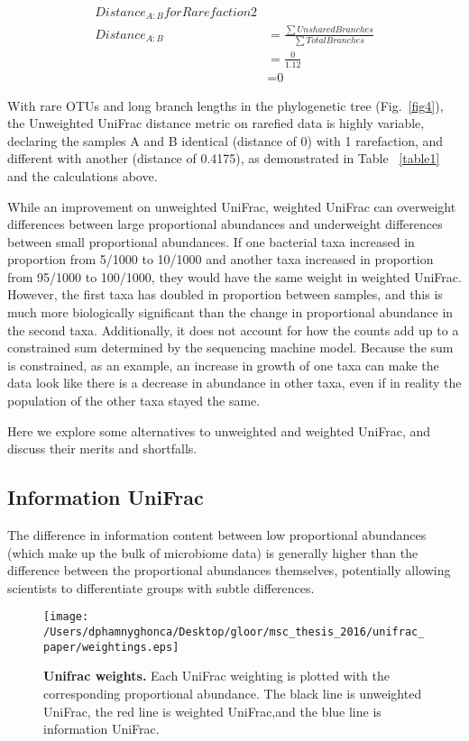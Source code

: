 \documentclass[10pt,letterpaper]{article}
\begin{document}
\begin{align*}
Distance_{A:B} for Rarefaction 2 &\\
Distance_{A:B} &=\frac{\sum Unshared Branches}{\sum Total Branches}\\
&= \frac{\text{0}}{\text{1.12}}\\ 
&= \text{0}
\end{align*}

With rare OTUs and long branch lengths in the phylogenetic tree (Fig.~\ref{fig4}), the Unweighted UniFrac distance metric on rarefied data is highly variable, declaring the samples A and B identical (distance of 0) with 1 rarefaction, and different with another (distance of 0.4175), as demonstrated in Table ~\ref{table1} and the calculations above.

While an improvement on unweighted UniFrac, weighted UniFrac can overweight differences between large proportional abundances and underweight differences between small proportional abundances. If one bacterial taxa increased in proportion from 5/1000 to 10/1000 and another taxa increased in proportion from 95/1000 to 100/1000, they would have the same weight in weighted UniFrac. However, the first taxa has doubled in proportion between samples, and this is much more biologically significant than the change in proportional abundance in the second taxa. Additionally, it does not account for how the counts add up to a constrained sum determined by the sequencing machine model. Because the sum is constrained, as an example, an increase in growth of one taxa can make the data look like there is a decrease in abundance in other taxa, even if in reality the population of the other taxa stayed the same.

Here we explore some alternatives to unweighted and weighted UniFrac, and discuss their merits and shortfalls.

\subsection{Information UniFrac}

The difference in information content between low proportional abundances (which make up the bulk of microbiome data) is generally higher than the difference between the proportional abundances themselves, potentially allowing scientists to differentiate groups with subtle differences.

\begin{figure}[h]
\texttt{[image: /Users/dphamnyghonca/Desktop/gloor/msc\_thesis\_2016/unifrac\_paper/weightings.eps]}
\caption{{\bf Unifrac weights. }
Each UniFrac weighting is plotted with the corresponding proportional abundance. The black line is unweighted UniFrac, the red line is weighted UniFrac,and  the blue line is information UniFrac. }
\label{fig5}
\end{figure}
\end{document}
